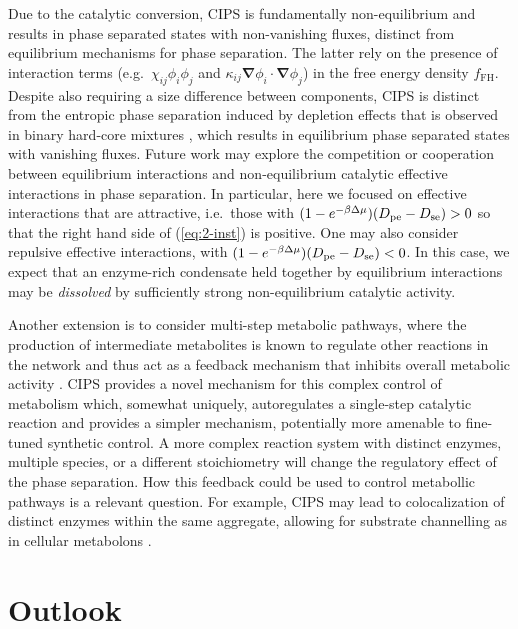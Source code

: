 Due to the catalytic conversion, CIPS is fundamentally non-equilibrium and results in phase separated states with non-vanishing fluxes, distinct from equilibrium mechanisms for phase separation. The latter rely on the presence of interaction terms (e.g.~$\chi_{ij}\phi_i\phi_j$ and $\kappa_{ij}\bm{\nabla} \phi_i \cdot \bm{\nabla} \phi_j$) in the free energy density $f_\mathrm{FH}$. Despite also requiring a size difference between components, CIPS is distinct from the entropic phase separation induced by depletion effects that is observed in binary hard-core mixtures \cite{frenkel_phase_1992}, which results in equilibrium phase separated states with vanishing fluxes. Future work may explore the competition or cooperation between equilibrium interactions and non-equilibrium catalytic effective interactions in phase separation. In particular, here we focused on effective interactions that are attractive, i.e.~those with $(1-e^{-\beta \Delta \mu})(D_{\mathrm{pe}}-D_{\mathrm{se}})>0$ so that the right hand side of (\ref{eq:2-inst}) is positive. One may also consider repulsive effective interactions, with $(1-e^{-\beta \Delta \mu})(D_{\mathrm{pe}}-D_{\mathrm{se}})<0$. In this case, we expect that an enzyme-rich condensate held together by equilibrium interactions may be {\it dissolved} by sufficiently strong non-equilibrium catalytic activity.

Another extension is to consider multi-step metabolic pathways, where the production of intermediate metabolites is known to regulate other reactions in the network and thus act as a feedback mechanism that inhibits overall metabolic activity \cite{oconnell_dynamic_2012,alam_self-inhibitory_2017}. CIPS provides a novel mechanism for this complex control of metabolism which, somewhat uniquely, autoregulates a single-step catalytic reaction and provides a simpler mechanism, potentially more amenable to fine-tuned synthetic control. A more complex reaction system with distinct enzymes, multiple species, or a different stoichiometry will change the regulatory effect of the phase separation. How this feedback could be used to control metabollic pathways is a relevant question. For example, CIPS may lead to colocalization of distinct enzymes within the same aggregate, allowing for substrate channelling as in cellular metabolons \cite{poshyvailo_does_2017, sweetlove_role_2018}.

\section{Outlook}

